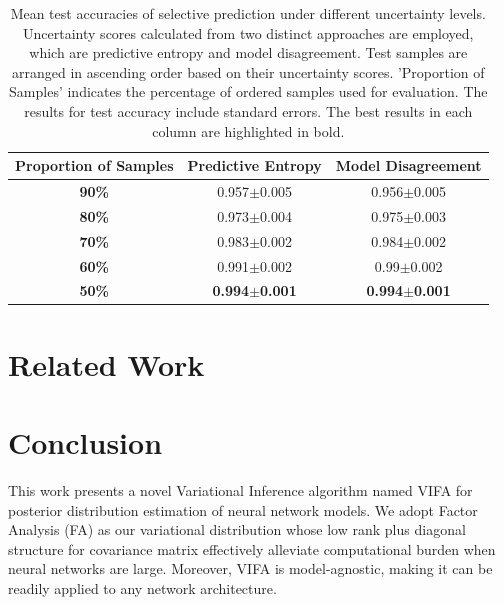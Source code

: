 \documentclass[10pt]{article} %
\begin{document}
\begin{table}[!htp]
\caption{Mean test accuracies of selective prediction under different uncertainty levels. Uncertainty scores calculated from two distinct approaches are employed, which are predictive entropy and model disagreement. Test samples are arranged in ascending order based on their uncertainty scores. 'Proportion of Samples' indicates the percentage of ordered samples used for evaluation. The results for test accuracy include standard errors. The best results in each column are highlighted in bold.}
\label{table: VIFA_uncertainty_acc}
\begin{center}
\begin{tabular}{c|c|c}
\textbf{Proportion of Samples} & \textbf{Predictive Entropy} & \textbf{Model Disagreement} \\ \hline
\textbf{90\%}                               & 0.957$\pm$0.005                 & 0.956$\pm$0.005                 \\
\textbf{80\%}                               & 0.973$\pm$0.004                 & 0.975$\pm$0.003                 \\
\textbf{70\%}                               & 0.983$\pm$0.002                 & 0.984$\pm$0.002                 \\
\textbf{60\%}                               & 0.991$\pm$0.002                 & 0.99$\pm$0.002                  \\
\textbf{50\%}                               & \textbf{0.994$\pm$0.001}                 & \textbf{0.994$\pm$0.001}        
\end{tabular}
\end{center}
\end{table}

\section{Related Work}


\section{Conclusion}
 This work presents a novel Variational Inference algorithm named VIFA for posterior distribution estimation of neural network models. We adopt Factor Analysis (FA) as our variational distribution whose low rank plus diagonal structure for covariance matrix effectively alleviate computational burden when neural networks are large. Moreover, VIFA is model-agnostic, making it can be readily applied to any network architecture. 
 
\end{document}
